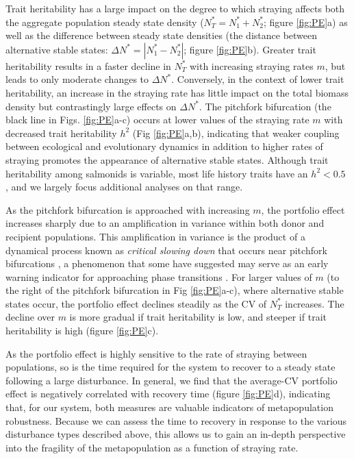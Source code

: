 \documentclass{revtex4}
\begin{document}
Trait heritability has a large impact on the degree to which straying affects both the aggregate population steady state density ($N^*_T=N^*_1+N^*_2$; figure \ref{fig:PE}a) as well as the difference between steady state densities (the distance between alternative stable states: $\Delta N^*=|N^*_1-N^*_2|$; figure \ref{fig:PE}b).
Greater trait heritability results in a faster decline in $N_T^*$ with increasing straying rates $m$, but leads to only moderate changes to $\Delta N^*$.
Conversely, in the context of lower trait heritability, an increase in the straying rate has little impact on the total biomass density but contrastingly large effects on $\Delta N^*$.
The pitchfork bifurcation (the black line in Figs. \ref{fig:PE}a-c) occurs at lower values of the straying rate $m$ with decreased trait heritability $h^2$ (Fig \ref{fig:PE}a,b), indicating that weaker coupling between ecological and evolutionary dynamics in addition to higher rates of straying promotes the appearance of alternative stable states.
Although trait heritability among salmonids is variable, most life history traits have an $h^2 <0.5$ \citep{Carlson:2008hl}, and we largely focus additional analyses on that range.

As the pitchfork bifurcation is approached with increasing $m$, the portfolio effect increases sharply due to an amplification in variance within both donor and recipient populations.
This amplification in variance is the product of a dynamical process known as \emph{critical slowing down} that occurs near pitchfork bifurcations \citep{Scheffer:2009gg}, a phenomenon that some have suggested may serve as an early warning indicator for approaching phase transitions \citep{Scheffer:2009gg,Lade:2012eu,Anonymous:2013br,Dakos:2014br,Krkosek:2014ch}.
For larger values of $m$ (to the right of the pitchfork bifurcation in Fig \ref{fig:PE}a-c), where alternative stable states occur, the portfolio effect declines steadily as the CV of $N_T^*$ increases.
The decline over $m$ is more gradual if trait heritability is low, and steeper if trait heritability is high (figure \ref{fig:PE}c).

As the portfolio effect is highly sensitive to the rate of straying between populations, so is the time required for the system to recover to a steady state following a large disturbance.
In general, we find that the average-CV portfolio effect is negatively correlated with recovery time (figure \ref{fig:PE}d), indicating that, for our system, both measures are valuable indicators of metapopulation robustness.
Because we can assess the time to recovery in response to the various disturbance types described above, this allows us to gain an in-depth perspective into the fragility of the metapopulation as a function of straying rate.
\end{document}
